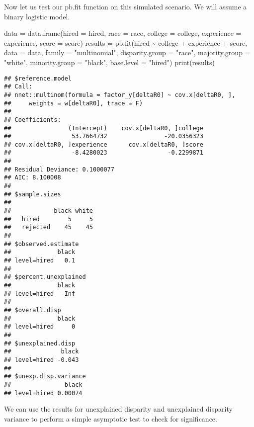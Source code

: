 \documentclass[
]{article}
\newenvironment{Shaded}{\begin{snugshade}}{\end{snugshade}}
\newcommand{\AttributeTok}[1]{\textcolor[rgb]{0.77,0.63,0.00}{#1}}
\newcommand{\FunctionTok}[1]{\textcolor[rgb]{0.00,0.00,0.00}{#1}}
\newcommand{\NormalTok}[1]{#1}
\newcommand{\OtherTok}[1]{\textcolor[rgb]{0.56,0.35,0.01}{#1}}
\newcommand{\SpecialCharTok}[1]{\textcolor[rgb]{0.00,0.00,0.00}{#1}}
\newcommand{\StringTok}[1]{\textcolor[rgb]{0.31,0.60,0.02}{#1}}
\begin{document}
Now let us test our pb.fit function on this simulated scenario. We will
assume a binary logistic model.

\begin{Shaded}
\begin{Highlighting}[]
\NormalTok{ data }\OtherTok{=} \FunctionTok{data.frame}\NormalTok{(}\AttributeTok{hired =}\NormalTok{ hired,}
                   \AttributeTok{race =}\NormalTok{ race,}
                   \AttributeTok{college =}\NormalTok{ college,}
                   \AttributeTok{experience =}\NormalTok{ experience,}
                   \AttributeTok{score =}\NormalTok{ score)}
\NormalTok{ results }\OtherTok{=} \FunctionTok{pb.fit}\NormalTok{(hired }\SpecialCharTok{\textasciitilde{}}\NormalTok{ college }\SpecialCharTok{+}\NormalTok{ experience }\SpecialCharTok{+}\NormalTok{ score,}
                  \AttributeTok{data =}\NormalTok{ data,}
                  \AttributeTok{family =} \StringTok{"multinomial"}\NormalTok{,}
                  \AttributeTok{disparity.group =} \StringTok{"race"}\NormalTok{,}
                  \AttributeTok{majority.group =} \StringTok{"white"}\NormalTok{,}
                  \AttributeTok{minority.group =} \StringTok{"black"}\NormalTok{,}
                  \AttributeTok{base.level =} \StringTok{"hired"}\NormalTok{)}
 \FunctionTok{print}\NormalTok{(results)}
\end{Highlighting}
\end{Shaded}

\begin{verbatim}
## $reference.model
## Call:
## nnet::multinom(formula = factor_y[deltaR0] ~ cov.x[deltaR0, ], 
##     weights = w[deltaR0], trace = F)
## 
## Coefficients:
##                (Intercept)    cov.x[deltaR0, ]college 
##                 53.7664732                -20.0356323 
## cov.x[deltaR0, ]experience      cov.x[deltaR0, ]score 
##                 -8.4280023                 -0.2299871 
## 
## Residual Deviance: 0.1000077 
## AIC: 8.100008 
## 
## $sample.sizes
##           
##            black white
##   hired        5     5
##   rejected    45    45
## 
## $observed.estimate
##             black
## level=hired   0.1
## 
## $percent.unexplained
##             black
## level=hired  -Inf
## 
## $overall.disp
##             black
## level=hired     0
## 
## $unexplained.disp
##              black
## level=hired -0.043
## 
## $unexp.disp.variance
##               black
## level=hired 0.00074
\end{verbatim}

We can use the results for unexplained disparity and unexplained
disparity variance to perform a simple asymptotic test to check for
significance.
\end{document}
